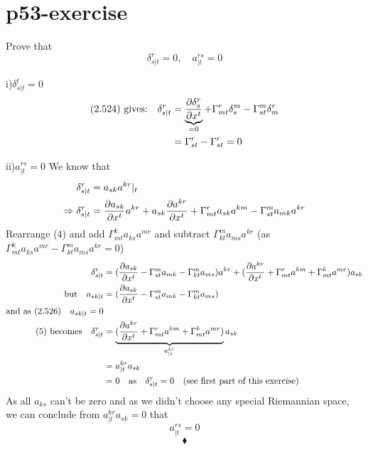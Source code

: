 \section{p53-exercise}
\begin{tcolorbox}
Prove that $$\delta^r_{s|t} = 0, \quad a^{rs}_{|t} = 0$$
\end{tcolorbox}

i)$\delta^t_{s|t} = 0$
\begin{align}
\text{(2.524) gives:}\quad \delta^r_{s|t} &= \underbrace{\pdv{\delta^r_{s}}{x^t}}_\text{=0} + \Gamma^r_{mt}\delta^m_{s}- \Gamma^m_{st}\delta^r_{m}\\
&= \Gamma^r_{st}- \Gamma^r_{st} = 0
\end{align}

ii)$ a^{rs}_{|t} = 0$
We know that 
\begin{align}
\delta^r_{s|t} &= a_{sk}a^{kr}|_{t}\\
\Rightarrow \delta^r_{s|t} &= \pdv{a_{sk}}{x^t}a^{kr}+ a_{sk}\pdv{a^{kr} }{x^t} + \Gamma^r_{mt}a_{sk}a^{km}- \Gamma^m_{st}a_{mk}a^{kr}
\end{align}
Rearrange (4) and add $\Gamma^k_{mt}a_{ks}a^{mr}$ and subtract $\Gamma^m_{kt}a_{ms}a^{kr}$ (as $\Gamma^k_{mt}a_{ks}a^{mr} - \Gamma^m_{kt}a_{ms}a^{kr}  =0 $)
\begin{align}
\delta^r_{s|t} &= (\pdv{a_{sk}}{x^t}- \Gamma^m_{st}a_{mk}-\Gamma^m_{kt}a_{ms} )a^{kr}+ (\pdv{a^{kr} }{x^t} + \Gamma^r_{mt}a^{km}+ \Gamma^k_{mt}a^{mr})a_{sk}\\
\text{but} \quad  a_{sk|t} &= (\pdv{a_{sk}}{x^t}- \Gamma^m_{st}a_{mk}-\Gamma^m_{kt}a_{ms})\\
\text{and as (2.526)}\quad a_{sk|t} = 0\\
\text{(5) becomes}\quad \delta^r_{s|t} &= \underbrace{(\pdv{a^{kr} }{x^t} + \Gamma^r_{mt}a^{km}+ \Gamma^k_{mt}a^{mr})}_{\begin{huge}a^{kr}_{|t}\end{huge}}a_{sk}\\
\ &= a^{kr}_{|t}a_{sk}\\
\ &= 0 \quad \text{as}\quad \delta^r_{s|t}=0  \quad \text{(see first  part of this exercise)}
\end{align}
As all $a_{ks}$ can't be zero and as we didn't choose any special Riemannian space, we can conclude from $ a^{kr}_{|t}a_{sk} = 0$ that $$ a^{rs}_{|t} = 0$$ 
$$\blacklozenge$$
\newpage


